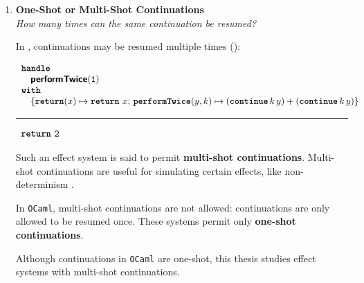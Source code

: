 \begin{enumerate}
        \item \textbf{\textsf{One-Shot or Multi-Shot Continuations}}\\
        \textit{How many times can the same continuation be resumed?}
 
        In \efflang{}, continuations may be resumed multiple times ():

        \begin{minipage}[t]{\linewidth}
          
        \begin{efflst}
          $\begin{array}{l}
            \textbf{\texttt{handle}} \\
            \quad \textbf{\textsf{performTwice}}(\texttt{1}) \\
            \textbf{\texttt{with}} \\
            \quad \{ \textbf{\texttt{return}}(x) \mapsto {\texttt{\textbf{return}} \,\, {x}};  \, \textbf{\texttt{performTwice}}(y, k) \mapsto (\textbf{\texttt{continue}} \, {k} \, {y}) + (\textbf{\texttt{continue}} \, {k} \, {y}) \}\\
          \end{array}$
          \vspace{2mm} 
          \textcolor{effComment}{\hrule height 0.2mm \relax}
          \vspace{2mm} 
          
          \textcolor{effComment}{$\begin{array}{l}\texttt{\textbf{return}} \,\, {\texttt{2}}\end{array}$}
        \end{efflst}
        \label{listing:eff-multishot}
      \end{minipage}
      \par\vspace{0.6\baselineskip}
        Such an effect system is said to permit \textbf{multi-shot continuations}. Multi-shot continuations are useful for simulating certain effects, like non-determinism \citep{phipps-costin-2023}. 

        In \texttt{OCaml}, multi-shot continuations are not allowed: continuations are only allowed to be resumed once. These systems permit only \textbf{one-shot continuations}. 

        Although continuations in \texttt{OCaml} are one-shot, this thesis studies effect systems with multi-shot continuations.
\end{enumerate}
